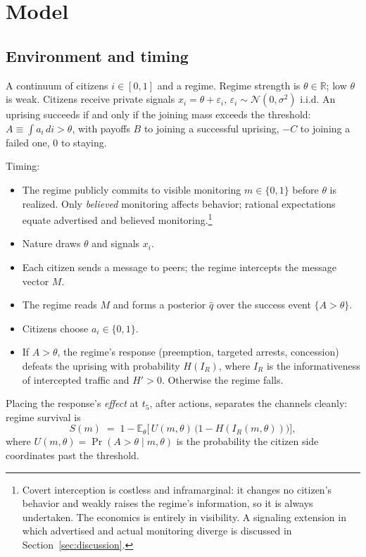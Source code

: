 \documentclass[11pt]{article}
\theoremstyle{remark}
\newcommand{\E}{\mathbb{E}}
\newcommand{\Prob}{\Pr}
\begin{document}
\section{Model}\label{sec:model}

\subsection{Environment and timing}

A continuum of citizens $i \in [0,1]$ and a regime. Regime strength is $\theta \in \mathbb{R}$; low $\theta$ is weak. Citizens receive private signals $x_i = \theta + \varepsilon_i$, $\varepsilon_i \sim \mathcal{N}(0,\sigma^2)$ i.i.d. An uprising succeeds if and only if the joining mass exceeds the threshold: $A \equiv \int a_i \, di > \theta$, with payoffs $B$ to joining a successful uprising, $-C$ to joining a failed one, $0$ to staying.

Timing:
\begin{itemize}
  \item[$t_0$.] The regime publicly commits to visible monitoring $m \in \{0,1\}$ before $\theta$ is realized. Only \emph{believed} monitoring affects behavior; rational expectations equate advertised and believed monitoring.\footnote{Covert interception is costless and inframarginal: it changes no citizen's behavior and weakly raises the regime's information, so it is always undertaken. The economics is entirely in visibility. A signaling extension in which advertised and actual monitoring diverge is discussed in Section~\ref{sec:discussion}.}
  \item[$t_1$.] Nature draws $\theta$ and signals $x_i$.
  \item[$t_2$.] Each citizen sends a message to peers; the regime intercepts the message vector $M$.
  \item[$t_3$.] The regime reads $M$ and forms a posterior $\hat{q}$ over the success event $\{A > \theta\}$.
  \item[$t_4$.] Citizens choose $a_i \in \{0,1\}$.
  \item[$t_5$.] If $A > \theta$, the regime's response (preemption, targeted arrests, concession) defeats the uprising with probability $H(I_R)$, where $I_R$ is the informativeness of intercepted traffic and $H' > 0$. Otherwise the regime falls.
\end{itemize}
Placing the response's \emph{effect} at $t_5$, after actions, separates the channels cleanly: regime survival is
\begin{equation}\label{eq:survival}
S(m) \;=\; 1 - \E_\theta\Big[\, U(m,\theta)\,\big(1 - H(I_R(m,\theta))\big) \Big],
\end{equation}
where $U(m,\theta) = \Prob(A > \theta \mid m, \theta)$ is the probability the citizen side coordinates past the threshold.
\end{document}
